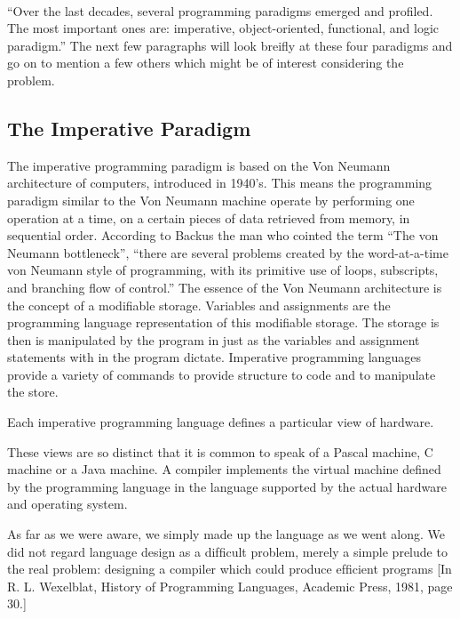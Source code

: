 \documentclass[main.tex]{subfiles}
\begin{document}
\paragraph{}``Over the last decades, several programming paradigms emerged and profiled. The most important ones are: imperative, object-oriented, functional, and logic paradigm.''\cite{Vujosevic2008} The next few paragraphs will look breifly at these four paradigms and go on to mention a few others which might be of interest considering the problem.

\subsection{The Imperative Paradigm}
The imperative programming paradigm is based on the Von Neumann architecture of computers, introduced in 1940’s. \cite{Vujosevic2008} This means the programming paradigm similar to the Von Neumann machine operate by performing one operation at a time, on a certain pieces of data retrieved from memory, in sequential order. According to Backus \cite{Backus1978} the man who cointed the term ``The von Neumann bottleneck'', ``there are several problems created by the word-at-a-time von Neumann style of programming, with its primitive use of loops, subscripts, and branching flow of control.'' The essence of the Von Neumann architecture is the concept of a modifiable storage. Variables and assignments are the programming language representation of this modifiable storage. The storage is then is manipulated by the program in just as the variables and assignment statements with in the program dictate. Imperative programming languages provide a variety of commands to provide structure to code and to manipulate the store.\cite{Aaby1996}

Each imperative programming language defines a particular view of hardware.

These views are so distinct that it is common to speak of a Pascal machine, C machine or a Java machine. A compiler implements the virtual machine defined by the programming language in the language supported by the actual hardware and operating system.

As far as we were aware, we simply made up the language as we went along. We did not regard language design as a difﬁcult problem, merely a simple prelude to the real problem: designing a compiler which could produce efﬁcient programs [In R. L. Wexelblat, History of Programming Languages, Academic Press, 
1981, page 30.]
\end{document}
